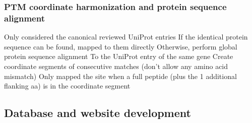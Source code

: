 \subsubsection{PTM coordinate harmonization and protein sequence alignment}
Only considered the canonical reviewed UniProt entries
If the identical protein sequence can be found, mapped to them directly
Otherwise, perform global protein sequence alignment
To the UniProt entry of the same gene
Create coordinate segments of consecutive matches (don't allow any amino acid mismatch)
Only mapped the site when a full peptide (plus the 1 additional flanking aa) is in the coordinate segment

\subsection{Database and website development}
